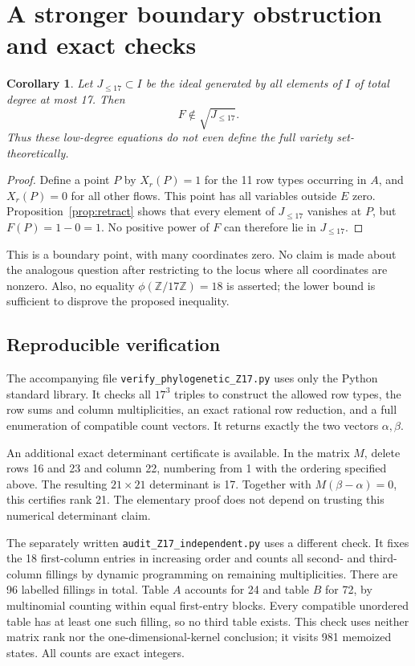 \documentclass[11pt,a4paper]{article}
\newtheorem{corollary}[theorem]{Corollary}
\newcommand{\ZZ}{\mathbb Z}
\begin{document}
\section{A stronger boundary obstruction and exact checks}
\begin{corollary}
Let $J_{\leq17}\subset I$ be the ideal generated by all elements of $I$
of total degree at most 17. Then
\[
 F\notin\sqrt{J_{\leq17}}.
\]
Thus these low-degree equations do not even define the full variety
set-theoretically.
\end{corollary}
\begin{proof}
Define a point $P$ by $X_r(P)=1$ for the 11 row types occurring in $A$,
and $X_r(P)=0$ for all other flows. This point has all variables outside
$E$ zero. Proposition~\ref{prop:retract} shows that every element of
$J_{\leq17}$ vanishes at $P$, but $F(P)=1-0=1$. No positive power of
$F$ can therefore lie in $J_{\leq17}$.
\end{proof}
This is a boundary point, with many coordinates zero. No claim is made
about the analogous question after restricting to the locus where all
coordinates are nonzero. Also, no equality $\phi(\ZZ/17\ZZ)=18$ is asserted;
the lower bound is sufficient to disprove the proposed inequality.

\subsection*{Reproducible verification}
The accompanying file \texttt{verify\_phylogenetic\_Z17.py} uses only the
Python standard library. It checks all $17^3$ triples to construct the
allowed row types, the row sums and column multiplicities, an exact
rational row reduction, and a full enumeration of compatible count
vectors. It returns exactly the two vectors $\alpha,\beta$.

An additional exact determinant certificate is available. In the matrix
$M$, delete rows 16 and 23 and column 22, numbering from 1 with the
ordering specified above. The resulting $21\times21$ determinant is 17.
Together with $M(\beta-\alpha)=0$, this certifies rank 21. The elementary
proof does not depend on trusting this numerical determinant claim.

The separately written \texttt{audit\_Z17\_independent.py} uses a different
check. It fixes the 18 first-column entries in increasing order and counts
all second- and third-column fillings by dynamic programming on remaining
multiplicities. There are 96 labelled fillings in total. Table $A$
accounts for 24 and table $B$ for 72, by multinomial counting within equal
first-entry blocks. Every compatible unordered table has at least one
such filling, so no third table exists. This check uses neither matrix
rank nor the one-dimensional-kernel conclusion; it visits 981 memoized
states. All counts are exact integers.
\end{document}
